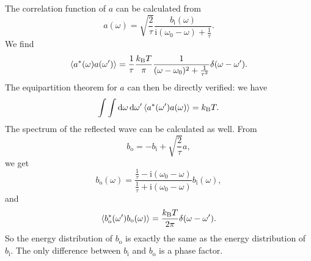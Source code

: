 \documentclass[hyperref, a4paper]{article}
\newcommand*{\ii}{\mathrm{i}}
\newcommand*{\kB}{k_{\text{B}}}
\newcommand*{\bi}{b_{\text{i}}}
\newcommand*{\bo}{b_{\text{o}}}
\begin{document}
The correlation function of $a$ can be calculated from 
\begin{equation}
    a(\omega) = \sqrt{\frac{2}{\tau}} \frac{\bi(\omega)}{\ii (\omega_0 - \omega) + \frac{1}{\tau}}.
\end{equation} 
We find 
\begin{equation}
    \expval{a^*(\omega) a(\omega')} = \frac{1}{\tau} \frac{\kB T}{\pi} \frac{1}{(\omega - \omega_0)^2 + \frac{1}{\tau^2}} \delta(\omega - \omega').
\end{equation}
The equipartition theorem for $a$ can then be directly verified: we have 
\begin{equation}
    \int \int \dd{\omega} \dd{\omega'} \expval{a^*(\omega') a(\omega)} = \kB T.
\end{equation}
The spectrum of the reflected wave can be calculated as well. 
From 
\begin{equation}
    \bo = - \bi + \sqrt{\frac{2}{\tau}} a ,
\end{equation}
we get 
\begin{equation}
    \bo(\omega) = \frac{\frac{1}{\tau} - \ii (\omega_0 - \omega)}{\frac{1}{\tau} + \ii (\omega_0 - \omega)} \bi(\omega), 
\end{equation}
and 
\begin{equation}
    \expval{\bo^*(\omega') \bo(\omega)} = \frac{\kB T}{2 \pi} \delta(\omega - \omega').
\end{equation}
So the energy distribution of $\bo$ is exactly the same as the energy distribution of $\bi$.
The only difference between $\bi$ and $\bo$ is a phase factor.
\end{document}
